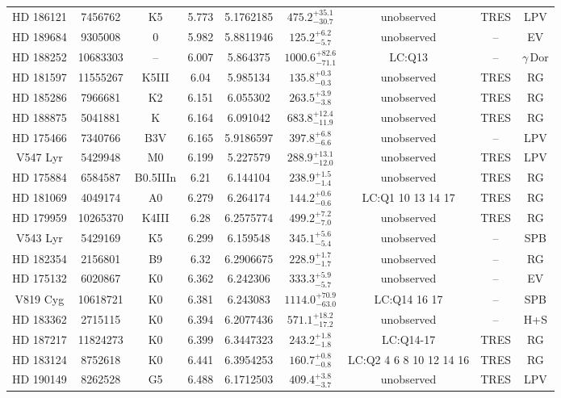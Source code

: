 \begin{table*}
\begin{tabular}{ccccccccc}
HD 186121 & 7456762 & K5 & 5.773 & 5.1762185 & $475.2^{+35.1}_{-30.7}$ & unobserved & TRES & LPV \\
HD 189684 & 9305008 & 0 & 5.982 & 5.8811946 & $125.2^{+6.2}_{-5.7}$ & unobserved & -- & EV \\
HD 188252 & 10683303 & -- & 6.007 & 5.864375 & $1000.6^{+82.6}_{-71.1}$ & LC:Q13 & -- & $\gamma\,\text{Dor}$ \\
HD 181597 & 11555267 & K5III & 6.04 & 5.985134 & $135.8^{+0.3}_{-0.3}$ & unobserved & TRES & RG \\
HD 185286 & 7966681 & K2 & 6.151 & 6.055302 & $263.5^{+3.9}_{-3.8}$ & unobserved & TRES & RG \\
HD 188875 & 5041881 & K & 6.164 & 6.091042 & $683.8^{+12.4}_{-11.9}$ & unobserved & TRES & RG \\
HD 175466 & 7340766 & B3V & 6.165 & 5.9186597 & $397.8^{+6.8}_{-6.6}$ & unobserved & -- & LPV \\
V547 Lyr & 5429948 & M0 & 6.199 & 5.227579 & $288.9^{+13.1}_{-12.0}$ & unobserved & TRES & LPV \\
HD 175884 & 6584587 & B0.5IIIn & 6.21 & 6.144104 & $238.9^{+1.5}_{-1.4}$ & unobserved & TRES & RG \\
HD 181069 & 4049174 & A0 & 6.279 & 6.264174 & $144.2^{+0.6}_{-0.6}$ & LC:Q1 10 13 14 17 & TRES & RG \\
HD 179959 & 10265370 & K4III & 6.28 & 6.2575774 & $499.2^{+7.2}_{-7.0}$ & unobserved & TRES & RG \\
V543 Lyr & 5429169 & K5 & 6.299 & 6.159548 & $345.1^{+5.6}_{-5.4}$ & unobserved & -- & SPB \\
HD 182354 & 2156801 & B9 & 6.32 & 6.2906675 & $228.9^{+1.7}_{-1.7}$ & unobserved & -- & RG \\
HD 175132 & 6020867 & K0 & 6.362 & 6.242306 & $333.3^{+5.9}_{-5.7}$ & unobserved & -- & EV \\
V819 Cyg & 10618721 & K0 & 6.381 & 6.243083 & $1114.0^{+70.9}_{-63.0}$ & LC:Q14 16 17 & -- & SPB \\
HD 183362 & 2715115 & K0 & 6.394 & 6.2077436 & $571.1^{+18.2}_{-17.2}$ & unobserved & -- & H+S \\
HD 187217 & 11824273 & K0 & 6.399 & 6.3447323 & $243.2^{+1.8}_{-1.8}$ & LC:Q14-17 & TRES & RG \\
HD 183124 & 8752618 & K0 & 6.441 & 6.3954253 & $160.7^{+0.8}_{-0.8}$ & LC:Q2 4 6 8 10 12 14 16 & TRES & RG \\
HD 190149 & 8262528 & G5 & 6.488 & 6.1712503 & $409.4^{+3.8}_{-3.7}$ & unobserved & TRES & LPV \\

\end{tabular}
\end{table*}
